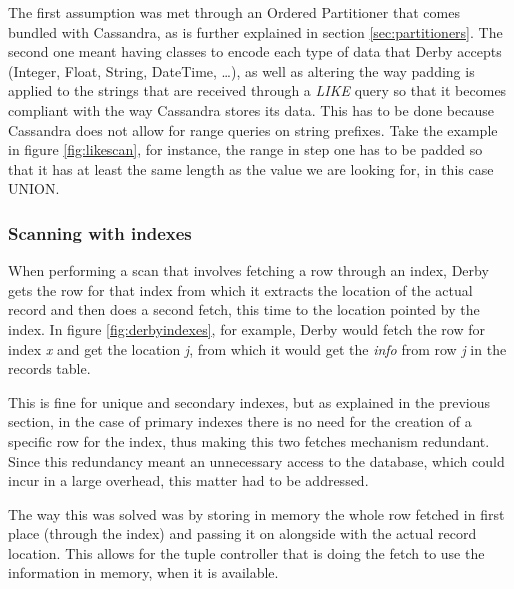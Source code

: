 The first assumption was met through an Ordered Partitioner that comes bundled with Cassandra, as is further explained in section \ref{sec:partitioners}. The second one meant having classes to encode each type of data that Derby accepts (Integer, Float, String, DateTime, \ldots), as well as altering the way padding is applied to the strings that are received through a \emph{LIKE} query so that it becomes compliant with the way Cassandra stores its data. This has to be done because Cassandra does not allow for range queries on string prefixes. Take the example in figure \ref{fig:likescan}, for instance, the range in step one has to be padded so that it has at least the same length as the value we are looking for, in this case UNION. 

\subsubsection{Scanning with indexes}

When performing a scan that involves fetching a row through an index, Derby gets the row for that index from which it extracts the location of the actual record and then does a second fetch, this time to the location pointed by the index. In figure \ref{fig:derbyindexes}, for example, Derby would fetch the row for index \emph{x} and get the location \emph{j}, from which it would get the \emph{info} from row \emph{j} in the records table.

This is fine for unique and secondary indexes, but as explained in the previous section, in the case of primary indexes there is no need for the creation of a specific row for the index, thus making this two fetches mechanism redundant. Since this redundancy meant an unnecessary access to the database, which could incur in a large overhead, this matter had to be addressed. 

The way this was solved was by storing in memory the whole row fetched in first place (through the index) and passing it on alongside with the actual record location. This allows for the tuple controller that is doing the fetch to use the information in memory, when it is available.   